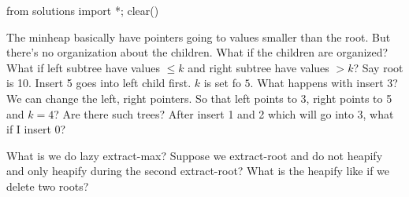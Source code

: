 \begin{python0}
from solutions import *; clear()
\end{python0}

The minheap basically have pointers going to values smaller
than the root.
But there's no organization about the children.
What if the children are organized?
What if left subtree have values $\leq k$ and 
right subtree have values $> k$?
Say root is 10.
Insert 5 goes into left child first. $k$ is set fo $5$.
What happens with insert 3?
We can change the left, right pointers.
So that left points to 3, right points to 5 
and $k = 4$?
Are there such trees?
After insert 1 and 2 which will go into 3,
what if I insert 0?

What is we do lazy extract-max?
Suppose we extract-root and do not heapify and only heapify during the 
second extract-root?
What is the heapify like if we delete two roots?

